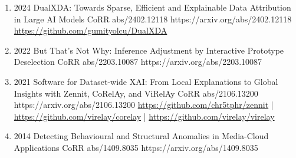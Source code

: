 {\begin{enumerate}
        \item {}
                        {2024}
                        {DualXDA: Towards Sparse, Efficient and Explainable Data Attribution in Large AI Models}
                        {CoRR abs/2402.12118}
                        {https://arxiv.org/abs/2402.12118}
                        {\\\href{https://github.com/gumityolcu/DualXDA}{https://github.com/gumityolcu/DualXDA}}
                        

        \item {}
                        {2022}
                        {But That's Not Why: Inference Adjustment by Interactive Prototype Deselection}
                        {CoRR abs/2203.10087}
                        {https://arxiv.org/abs/2203.10087}

        \item {}
                        {2021}
                        {Software for Dataset-wide XAI: From Local Explanations to Global Insights with Zennit, CoRelAy, and ViRelAy}
                        {CoRR abs/2106.13200}
                        {https://arxiv.org/abs/2106.13200}
                        {   \href{https://github.com/chr5tphr/zennit}{https://github.com/chr5tphr/zennit} | \\
                            \href{https://github.com/virelay/corelay}{https://github.com/virelay/corelay} |
                            \href{https://github.com/virelay/virelay}{https://github.com/virelay/virelay}
                        }

        \item {}
                        {2014}
                        {Detecting Behavioural and Structural Anomalies in Media-Cloud Applications}
                        {CoRR abs/1409.8035}
                        {https://arxiv.org/abs/1409.8035}

    \end{enumerate}

}


